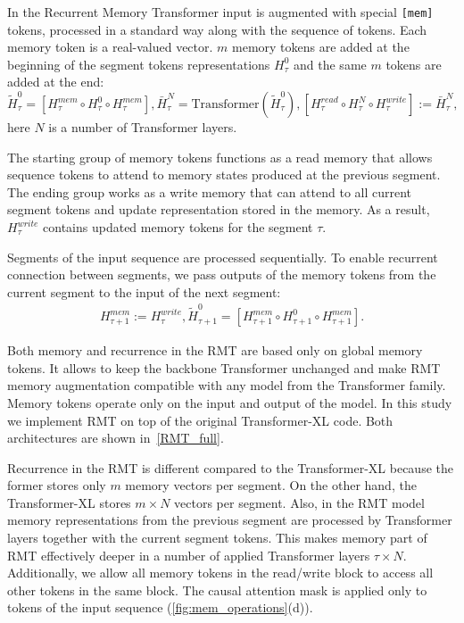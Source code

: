   In the Recurrent Memory Transformer  input is augmented with special \texttt{[mem]} tokens, processed in a standard way along with the sequence of tokens. Each memory token is a real-valued vector. $m$ memory tokens are added at the beginning of the segment tokens representations $H_{\tau}^0$ and the same $m$ tokens are added at the end:
  \begin{equation*}
  \tilde{H}^{0}_{\tau} = [H_{\tau}^{mem} \circ H_{\tau}^0 \circ H_{\tau}^{mem}],
  \bar{H}^N_\tau = \text{Transformer}(\tilde{H}^{0}_{\tau}),
  [H_{\tau}^{read} \circ H_{\tau}^N \circ H_{\tau}^{write}] := \bar{H}^N_\tau,
  \end{equation*}
  here $N$ is a number of Transformer layers.
  
  The starting group of memory tokens functions as a read memory that allows sequence tokens to attend to memory states produced at the previous segment. The ending group works as a write memory that can attend to all current segment tokens and update representation stored in the memory. As a result, $H_{\tau}^{write}$ contains updated memory tokens for the segment $\tau$.
  
  Segments of the input sequence are processed sequentially. To enable recurrent connection between segments, we pass outputs of the memory tokens from the current segment to the input of the next segment:
  \begin{equation*}
  \begin{gathered}
  H_{\tau+1}^{mem} := H_{\tau}^{write},
  \tilde{H}^{0}_{\tau+1} = [H_{\tau+1}^{mem} \circ H_{\tau+1}^0 \circ H_{\tau+1}^{mem}].
  \end{gathered}
  \end{equation*}
  
  Both memory and recurrence in the RMT are based only on global memory tokens. It allows to keep the backbone Transformer unchanged and make RMT memory augmentation compatible with any model from the Transformer family.
  Memory tokens operate only on the input and output of the model. In this study we implement RMT on top of the original Transformer-XL code. Both architectures are shown in~\cref{RMT_full}.
  
  Recurrence in the RMT is different compared to the Transformer-XL because the former stores only $m$ memory vectors per segment. On the other hand, the Transformer-XL stores $m \times N$ vectors per segment. Also, in the RMT model memory representations from the previous segment are processed by Transformer layers together with the current segment tokens. This makes memory part of RMT effectively deeper in a number of applied Transformer layers $\tau \times N$. Additionally, we allow all memory tokens in the read/write block to access all other tokens in the same block. The causal attention mask is applied only to tokens of the input sequence (\cref{fig:mem_operations}(d)).
  
